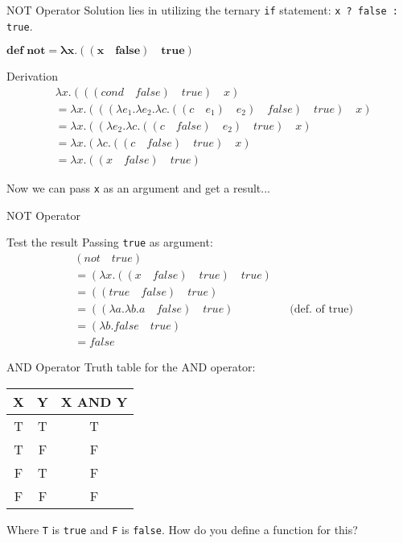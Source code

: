 \documentclass{beamer}
\begin{document}
\begin{frame}{NOT Operator}
Solution lies in utilizing the ternary \texttt{if} statement: \texttt{x ? false : true}.
\begin{framed} $\mathbf{def \; not = \lambda x . ((x \quad false) \quad true)}$ \end{framed}
\begin{block}{Derivation}
\begin{align*}
	&\lambda x . (((cond \quad false) \quad true) \quad x) \\
    &= \lambda x.(((\lambda e_1. \lambda e_2 . \lambda c . ((c \quad e_1) \quad e_2) \quad false) \quad true) \quad x) \\
    &= \lambda x.((\lambda e_2 . \lambda c . ((c \quad false) \quad e_2) \quad true) \quad x) \\
    &= \lambda x.(\lambda c . ((c \quad false) \quad true) \quad x) \\
    &= \lambda x.((x \quad false) \quad true)
\end{align*}
\end{block}
Now we can pass \texttt{x} as an argument and get a result...
\end{frame}

\begin{frame}{NOT Operator}
\begin{block}{Test the result}
Passing \texttt{true} as argument:
\begin{align*}
	&(not \quad true) \\
    &= (\lambda x. ((x \quad false) \quad true) \quad true) &&\\
    &= ((true \quad false) \quad true) &&\\
    &= ((\lambda a . \lambda b . a \quad false) \quad true) &&\text{(def. of true)}\\
    &= (\lambda b . false \quad true) &&\\
    &= false &&
\end{align*}
\end{block}
\end{frame}

\begin{frame}{AND Operator}
Truth table for the AND operator:
\begin{table}
\centering
\begin{tabular}{c|c|c}
X & Y & X AND Y \\\hline
T & T & T \\
T & F & F \\
F & T & F \\
F & F & F
\end{tabular}
\end{table}
Where \texttt{T} is \texttt{true} and \texttt{F} is \texttt{false}. How do you define a function for this?
\end{frame}
\end{document}
